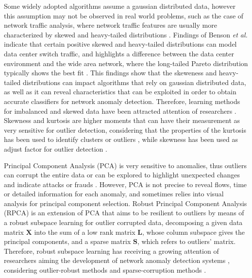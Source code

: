 \documentclass[review]{elsarticle}
\begin{document}
Some widely adopted algorithms assume a gaussian distributed data, however this assumption may not be observed in real world problems, such as the case of network traffic analysis, where network traffic features are usually more characterized by skewed and heavy-tailed distributions \cite{lakhina2005mining,benson2010network}. Findings of Benson \emph{et al.}  \cite{benson2010network} indicate that certain positive skewed and heavy-tailed distributions can model data center switch traffic, and highlights a difference between the data center environment and the wide area network, where the long-tailed Pareto distribution typically shows the best fit \cite{benson2010network}. This findings show that the skeweness and heavy-tailed distributions can impact algorithms that rely on gaussian distributed data, as well as it can reveal characteristics that can be exploited in order to obtain accurate classifiers for network anomaly detection. Therefore, learning methods for imbalanced and skewed data have been attracted attention of researchers \cite{Phua2004minority,hubert2009robustskewed}. Skewness and kurtosis are higher moments that can have their measurement as very sensitive for outlier detection, considering that the properties of the kurtosis has been used to identify clusters or outliers \cite{pena2010eigenvectors}, while skewness has been used as adjust factor for outlier detection \cite{hubert2009robustskewed}.

Principal Component Analysis (PCA) is very sensitive to anomalies, thus outliers can corrupt the entire data or can be explored to highlight unexpected changes and indicate attacks or frauds \cite{callegari2011novel,Lee2013,vieira2017model}. However, PCA is not precise to reveal flows, time or detailed information for each anomaly, and sometimes relies into visual analysis for principal component selection. Robust Principal Component Analysis (RPCA) \cite{candes2011robust} is an extension of PCA that aims to be resilient to outliers by means of a robust subspace learning \cite{vaswani2018robust} for outlier corrupted data, decomposing a given data matrix $\textbf{X}$ into the sum of a low rank matrix $\textbf{L}$, whose column subspace gives the principal components, and a sparse matrix $\textbf{S}$, which refers to outliers’ matrix. Therefore, robust subspace learning has receiving a growing attention of researchers aiming the development of network anomaly detection systems \cite{rousseeuw1984mcd, rousseeuw1999fastmcd, hubert2005robpca,hubert2009robustskewed, pascoal2012robust, zhou2017anomaly}, considering outlier-robust methods and sparse-corruption methods \cite{lerman2018overview}.
\end{document}
